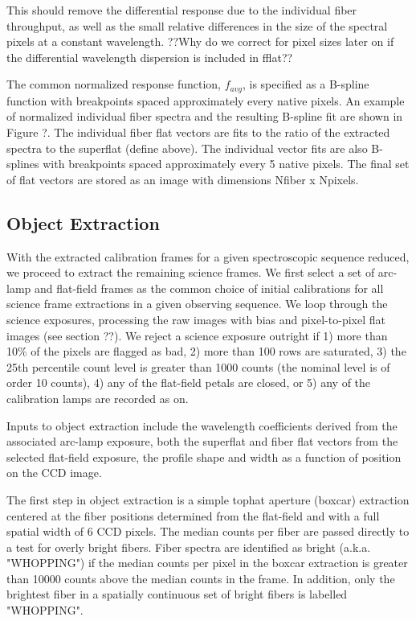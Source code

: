 This should remove the differential response due to the individual fiber
throughput, as well as the small relative differences in the size of the
spectral pixels at a constant wavelength.  ??Why do we correct for pixel
sizes later on if the differential wavelength dispersion is included in fflat??

The common normalized response function, $f_{avg}$, is specified as a B-spline
function with breakpoints spaced approximately every native pixels.
An example of normalized individual fiber spectra 
and the resulting B-spline fit are shown in Figure ?.  The individual fiber
flat vectors are fits to the ratio of the extracted spectra to the superflat
(define above).  The individual vector fits are also B-splines with breakpoints
spaced approximately every 5 native pixels.  The final set of flat vectors are
stored as an image with dimensions Nfiber x Npixels.


\subsection{Object Extraction}

With the extracted calibration frames for a given spectroscopic sequence
reduced, we proceed to extract the remaining science frames.
We first select a set of arc-lamp and flat-field frames as the common
choice of initial calibrations for all science frame extractions in a given
observing sequence.  We loop through the science exposures, processing the
raw images with bias and pixel-to-pixel flat images (see section ??).
We reject a science exposure outright if 1) more than 10\% of the pixels
are flagged as bad, 2) more than 100 rows are saturated, 3) the 25th
percentile count level is greater than 1000 counts (the nominal level
is of order 10 counts), 4) any of the flat-field petals are closed, or 5)
any of the calibration lamps are recorded as on.

Inputs to object extraction include the wavelength coefficients derived
from the associated arc-lamp exposure, both the superflat and fiber flat
vectors from the selected flat-field exposure, the profile shape and width
as a function of position on the CCD image.

The first step in object extraction is a simple tophat aperture (boxcar) 
extraction centered at the fiber positions determined from the flat-field 
and with a full spatial width of 6 CCD pixels.  The median counts per fiber 
are passed directly to a test for overly bright fibers. Fiber spectra are 
identified as bright (a.k.a. "WHOPPING") if the median counts per pixel in the 
boxcar extraction is greater than 10000 counts above the median counts in the 
frame.  In addition, only the brightest fiber in a spatially continuous set of 
bright fibers is labelled "WHOPPING". 



